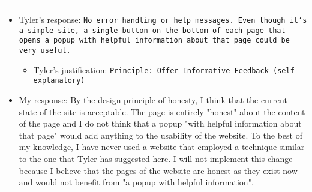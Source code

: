 \documentclass{article}
\begin{document}
\noindent\rule{3cm}{0.4pt}
\begin{itemize}
	\item Tyler's response: \texttt{No error handling or help messages.  Even though it’s a simple site, a single button on the bottom of each page that opens a popup with helpful information about that page could be very useful.}
	\begin{itemize}
		\item Tyler's justification: \texttt{Principle: Offer Informative Feedback (self-explanatory)}
	\end{itemize}
	\item My response: By the design principle of honesty, I think that the current state of the site is acceptable.  The page is entirely "honest" about the content of the page and I do not think that a popup "with helpful information about that page" would add anything to the usability of the website.  To the best of my knowledge, I have never used a website that employed a technique similar to the one that Tyler has suggested here.  I will not implement this change because I believe that the pages of the website are honest as they exist now and would not benefit from "a popup with helpful information".
\end{itemize}
\end{document}
